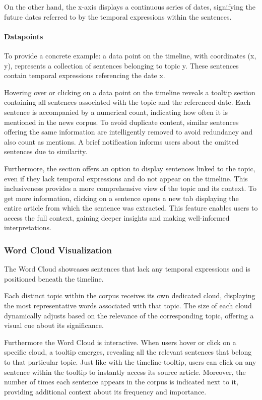 \documentclass[a4paper,10pt]{report} %
\begin{document}
On the other hand, the x-axis displays a continuous series of dates, signifying the future dates referred to by the temporal expressions within the sentences.

\paragraph{Datapoints}
To provide a concrete example: a data point on the timeline, with coordinates (x, y), represents a collection of sentences belonging to topic y. These sentences contain temporal expressions referencing the date x.

Hovering over or clicking on a data point on the timeline reveals a tooltip section containing all sentences associated with the topic and the referenced date. Each sentence is accompanied by a numerical count, indicating how often it is mentioned in the news corpus. To avoid duplicate content, similar sentences offering the same information are intelligently removed to avoid redundancy and also count as mentions. A brief notification informs users about the omitted sentences due to similarity.

Furthermore, the section offers an option to display sentences linked to the topic, even if they lack temporal expressions and do not appear on the timeline. This inclusiveness provides a more comprehensive view of the topic and its context. To get more information, clicking on a sentence opens a new tab displaying the entire article from which the sentence was extracted. This feature enables users to access the full context, gaining deeper insights and making well-informed interpretations.

\subsubsection{Word Cloud Visualization}
The Word Cloud showcases sentences that lack any temporal expressions and is positioned beneath the timeline.

Each distinct topic within the corpus receives its own dedicated cloud, displaying the most representative words associated with that topic. The size of each cloud dynamically adjusts based on the relevance of the corresponding topic, offering a visual cue about its significance.

Furthermore the Word Cloud is interactive. When users hover or click on a specific cloud, a tooltip emerges, revealing all the relevant sentences that belong to that particular topic. Just like with the timeline-tooltip, users can click on any sentence within the tooltip to instantly access its source article. Moreover, the number of times each sentence appears in the corpus is indicated next to it, providing additional context about its frequency and importance.
\end{document}
